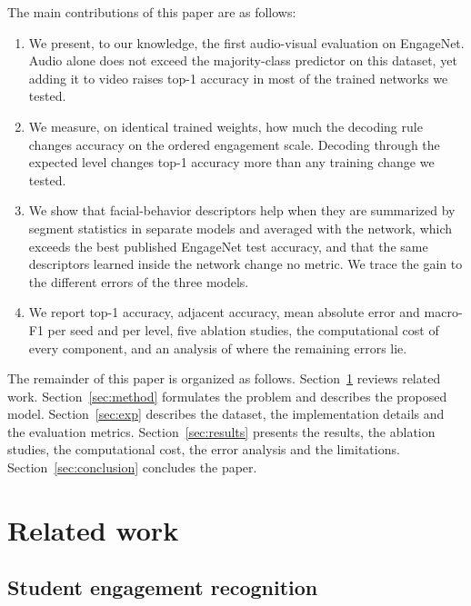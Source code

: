 \documentclass[pdflatex,iicol,sn-basic]{sn-jnl}
\begin{document}
The main contributions of this paper are as follows:
\begin{enumerate}
\item We present, to our knowledge, the first audio-visual evaluation on EngageNet. Audio alone does not exceed the majority-class predictor on this dataset, yet adding it to video raises top-1 accuracy in most of the trained networks we tested.
\item We measure, on identical trained weights, how much the decoding rule changes accuracy on the ordered engagement scale. Decoding through the expected level changes top-1 accuracy more than any training change we tested.
\item We show that facial-behavior descriptors help when they are summarized by segment statistics in separate models and averaged with the network, which exceeds the best published EngageNet test accuracy, and that the same descriptors learned inside the network change no metric. We trace the gain to the different errors of the three models.
\item We report top-1 accuracy, adjacent accuracy, mean absolute error and macro-F1 per seed and per level, five ablation studies, the computational cost of every component, and an analysis of where the remaining errors lie.
\end{enumerate}

The remainder of this paper is organized as follows. Section~\ref{sec:related} reviews related work. Section~\ref{sec:method} formulates the problem and describes the proposed model. Section~\ref{sec:exp} describes the dataset, the implementation details and the evaluation metrics. Section~\ref{sec:results} presents the results, the ablation studies, the computational cost, the error analysis and the limitations. Section~\ref{sec:conclusion} concludes the paper.

\section{Related work}\label{sec:related}

\subsection{Student engagement recognition}\label{sec:rw_engagement}
\end{document}
